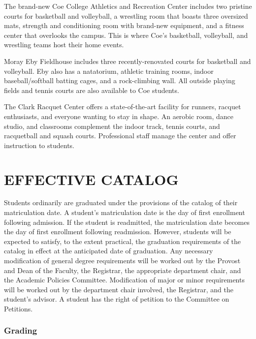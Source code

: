 \documentclass[
  letterpaper,
]{scrbook}
\renewcommand{\part}[1]{\addcontentsline{toc}{part}{#1}}
\begin{document}
The brand-new Coe College Athletics and Recreation Center includes two
pristine courts for basketball and volleyball, a wrestling room that
boasts three oversized mats, strength and conditioning room with
brand-new equipment, and a fitness center that overlooks the campus.
This is where Coe's basketball, volleyball, and wrestling teams host
their home events.

Moray Eby Fieldhouse includes three recently-renovated courts for
basketball and volleyball. Eby also has a natatorium, athletic training
rooms, indoor baseball/softball batting cages, and a rock-climbing wall.
All outside playing fields and tennis courts are also available to Coe
students.

The Clark Racquet Center offers a state-of-the-art facility for runners,
racquet enthusiasts, and everyone wanting to stay in shape. An aerobic
room, dance studio, and classrooms complement the indoor track, tennis
courts, and racquetball and squash courts. Professional staff manage the
center and offer instruction to students.

\part{COLLEGE REGULATIONS}

\chapter{EFFECTIVE CATALOG}\label{effective-catalog}

Students ordinarily are graduated under the provisions of the catalog of
their matriculation date. A student's matriculation date is the day of
first enrollment following admission. If the student is readmitted, the
matriculation date becomes the day of first enrollment following
readmission. However, students will be expected to satisfy, to the
extent practical, the graduation requirements of the catalog in effect
at the anticipated date of graduation. Any necessary modification of
general degree requirements will be worked out by the Provost and Dean
of the Faculty, the Registrar, the appropriate department chair, and the
Academic Policies Committee. Modification of major or minor requirements
will be worked out by the department chair involved, the Registrar, and
the student's advisor. A student has the right of petition to the
Committee on Petitions.

\subsection{Grading}\label{sec-grading}
\end{document}
